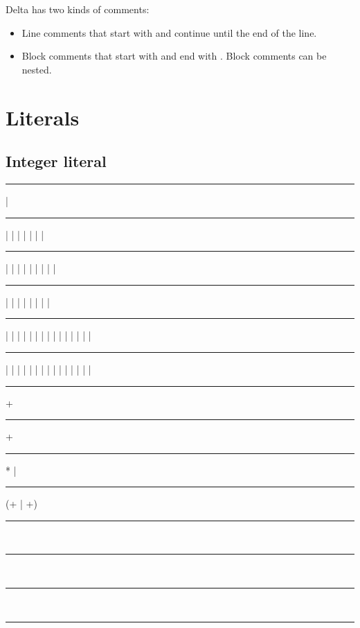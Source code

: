 Delta has two kinds of comments:

\begin{itemize}
    \item Line comments that start with \code{//} and continue until the end of the line.
    \item Block comments that start with \code{/*} and end with \code{*/}. Block comments can be nested.
\end{itemize}

\section{Literals}

\subsection{Integer literal}

\begin{grammar}
    \rule{binary-digit}  | \\
    \rule{octal-digit}  |  |  |  |  |  |  | \\
    \rule{decimal-digit}  |  |  |  |  |  |  |  |  | \\
    \rule{nonzero-decimal-digit}  |  |  |  |  |  |  |  | \\
    \rule{lowercase-hex-digit}  |  |  |  |  |  |  |  |  |  |  |  |  |  |  | \\
    \rule{uppercase-hex-digit}  |  |  |  |  |  |  |  |  |  |  |  |  |  |  | 

    \rule{binary-integer-literal} +\\
    \rule{octal-integer-literal} +\\
    \rule{decimal-integer-literal}  * | \\
    \rule{hex-integer-literal} (+ | +)

    \rule{integer-literal} \\
    \rule{integer-literal} \\
    \rule{integer-literal} \\
    \rule{integer-literal} 
\end{grammar}

